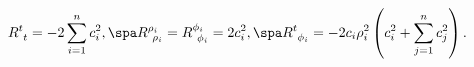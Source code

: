 \begin{equation}
\label{riccin}
R^t_{\ t} = -2 \sum_{i=1}^n c_i^2,
\spa
R^{\rho_i}_{\ \rho_i} = R^{\phi_i}_{\ \phi_i} = 2 c_i^2,
\spa
R^t_{\ \phi_i} = - 2 c_i \rho_i^2 \left( c_i^2 + \sum_{j=1}^n c_j^2 \right).
\end{equation}

